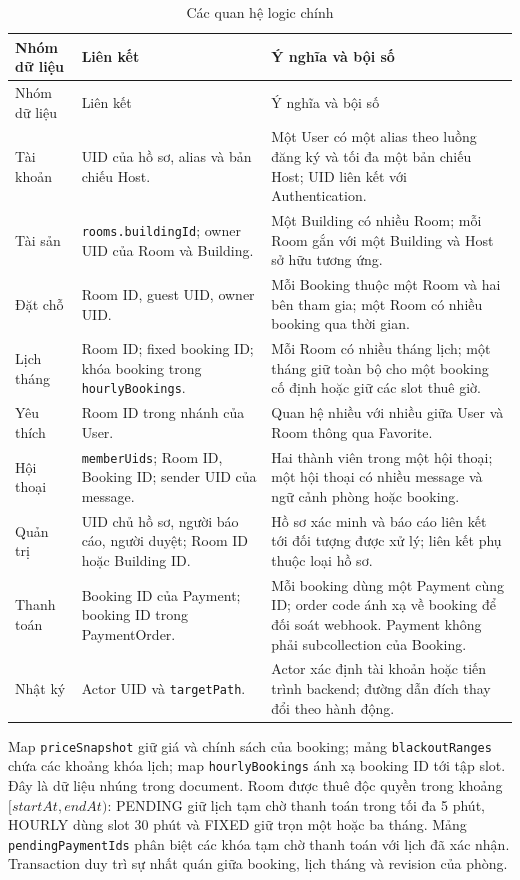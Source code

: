 \begingroup\small{}
\begin{longtable}{@{}>{\raggedright\arraybackslash}p{4.2cm}>{\raggedright\arraybackslash}p{5.15cm}>{\raggedright\arraybackslash}p{5.9cm}@{}}
\caption{Các quan hệ logic chính}\label{tab:ch4-relations-summary}\\
\toprule Nhóm dữ liệu & Liên kết & Ý nghĩa và bội số \\ \midrule\endfirsthead
\toprule Nhóm dữ liệu & Liên kết & Ý nghĩa và bội số \\ \midrule\endhead
\bottomrule\endlastfoot
Tài khoản & UID của hồ sơ, alias và bản chiếu Host. & Một User có một alias theo luồng đăng ký và tối đa một bản chiếu Host; UID liên kết với Authentication. \\
Tài sản & \texttt{rooms.\allowbreak{}building\allowbreak{}Id}; owner UID của Room và Building. & Một Building có nhiều Room; mỗi Room gắn với một Building và Host sở hữu tương ứng. \\
Đặt chỗ & Room ID, guest UID, owner UID. & Mỗi Booking thuộc một Room và hai bên tham gia; một Room có nhiều booking qua thời gian. \\
Lịch tháng & Room ID; fixed booking ID; khóa booking trong \texttt{hourly\allowbreak{}Bookings}. & Mỗi Room có nhiều tháng lịch; một tháng giữ toàn bộ cho một booking cố định hoặc giữ các slot thuê giờ. \\
Yêu thích & Room ID trong nhánh của User. & Quan hệ nhiều với nhiều giữa User và Room thông qua Favorite. \\
Hội thoại & \texttt{member\allowbreak{}Uids}; Room ID, Booking ID; sender UID của message. & Hai thành viên trong một hội thoại; một hội thoại có nhiều message và ngữ cảnh phòng hoặc booking. \\
Quản trị & UID chủ hồ sơ, người báo cáo, người duyệt; Room ID hoặc Building ID. & Hồ sơ xác minh và báo cáo liên kết tới đối tượng được xử lý; liên kết phụ thuộc loại hồ sơ. \\
Thanh toán & Booking ID của Payment; booking ID trong PaymentOrder. & Mỗi booking dùng một Payment cùng ID; order code ánh xạ về booking để đối soát webhook. Payment không phải subcollection của Booking.  \\
Nhật ký & Actor UID và \texttt{target\allowbreak{}Path}. & Actor xác định tài khoản hoặc tiến trình backend; đường dẫn đích thay đổi theo hành động. \\
\end{longtable}\endgroup

Map \texttt{price\allowbreak{}Snapshot} giữ giá và chính sách của booking; mảng \texttt{blackout\allowbreak{}Ranges} chứa các khoảng khóa lịch; map \texttt{hourly\allowbreak{}Bookings} ánh xạ booking ID tới tập slot. Đây là dữ liệu nhúng trong document. Room được thuê độc quyền trong khoảng $[startAt,endAt)$: PENDING giữ lịch tạm chờ thanh toán trong tối đa 5 phút, HOURLY dùng slot 30 phút và FIXED giữ trọn một hoặc ba tháng. Mảng \texttt{pending\allowbreak{}Payment\allowbreak{}Ids} phân biệt các khóa tạm chờ thanh toán với lịch đã xác nhận. Transaction duy trì sự nhất quán giữa booking, lịch tháng và revision của phòng.

